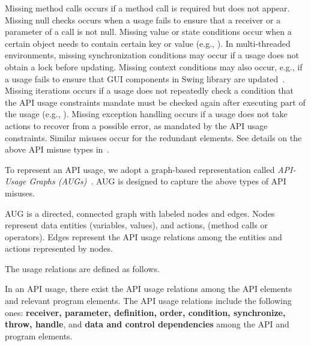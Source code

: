 Missing method calls occurs if a method call is required but does not
appear. Missing null checks occurs when a usage fails to ensure that a
receiver or a parameter of a call is not null. Missing value or state
conditions occur when a certain object needs to contain certain key or
value (e.g., ). In multi-threaded environments, missing
synchronization conditions may occur if a usage does not obtain a lock
before updating. Missing context conditions may also occur, e.g., if a
usage fails to ensure that GUI components in Swing library are
updated~\cite{msr19}. Missing iterations occurs if a usage does not
repeatedly check a condition that the API usage constraints mandate
must be checked again after executing part of the usage (e.g.,
). Missing exception handling occurs if a usage does not
take actions to recover from a possible error, as mandated by the API
usage constraints. Similar misuses occur for the redundant
elements. See details on the above API misuse types in~\cite{msr19}.

To represent an API usage, we adopt a graph-based representation
called {\em API-Usage Graphs (AUGs)}~\cite{msr19}. AUG is designed
to capture the above types of API misuses.

\begin{Definition}
AUG is a directed, connected graph with labeled nodes and
edges. Nodes represent data entities (variables, values), and actions,
(method calls or operators). Edges represent the API usage
relations among the entities and actions represented by nodes.
\end{Definition}

The usage relations are defined as follows.

\begin{Definition}
  In an API usage, there exist the API usage relations among the API
  elements and relevant program elements. The API usage relations
  include the following ones: {\bf receiver, parameter, definition,
    order, condition, synchronize, throw, handle}, and {\bf data and
    control dependencies} among the API and program elements.
\end{Definition}

